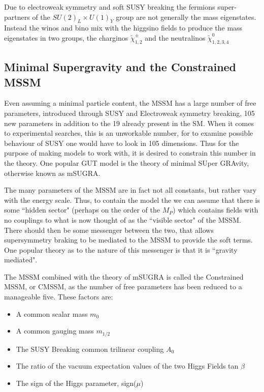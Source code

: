 Due to electroweak symmetry and soft SUSY breaking the fermions super-partners of the $SU(2)_{L} \times U(1)_{Y}$ group are not generally the mass eigenstates. Instead the winos and bino mix with the higgsino fields to produce the mass eigenstates in two groups, the charginos $\tilde{\chi}^{\pm}_{1,2}$ and the neutralinos $\tilde{\chi}^{0}_{1,2,3,4}$


\subsection{Minimal Supergravity and the Constrained MSSM}

Even assuming a minimal particle content, the MSSM has a large number of free parameters, introduced through SUSY and Electroweak symmetry breaking, 105 new parameters in addition to the 19 already present in the SM. When it comes to experimental searches, this is an unworkable number, for to examine possible behaviour of SUSY one would have to look in 105 dimensions. Thus for the purpose of making models to work with, it is desired to constrain this number in the theory. One popular GUT model is the theory of minimal SUper GRAvity, otherwise known as mSUGRA. 

The many parameters of the MSSM are in fact not all constants, but rather vary with the energy scale. Thus, to contain the model the we can assume that there is some ``hidden sector" (perhaps on the order of the $M_{P}$) which contains fields with no couplings to what is now thought of as the ``visible sector" of the MSSM. There should then be some messenger between the two, that allows supersymmetry braking to be mediated to the MSSM to provide the soft terms. One popular theory as to the nature of this messenger is that it is ``gravity mediated". 

The MSSM combined with the theory of mSUGRA is called the Constrained MSSM, or CMSSM, as the number of free parameters has been reduced to a manageable five. These factors are:

\begin{itemize}
\item{A common scalar mass $m_{0}$}
\item{A common gauging mass $m_{1/2}$}
\item{The SUSY Breaking common trilinear coupling $A_{0}$}
\item{The ratio of the vacuum expectation values of the two Higgs Fields tan $\beta$}
\item{ The sign of the Higgs parameter, sign($\mu$)}
\end{itemize} 


